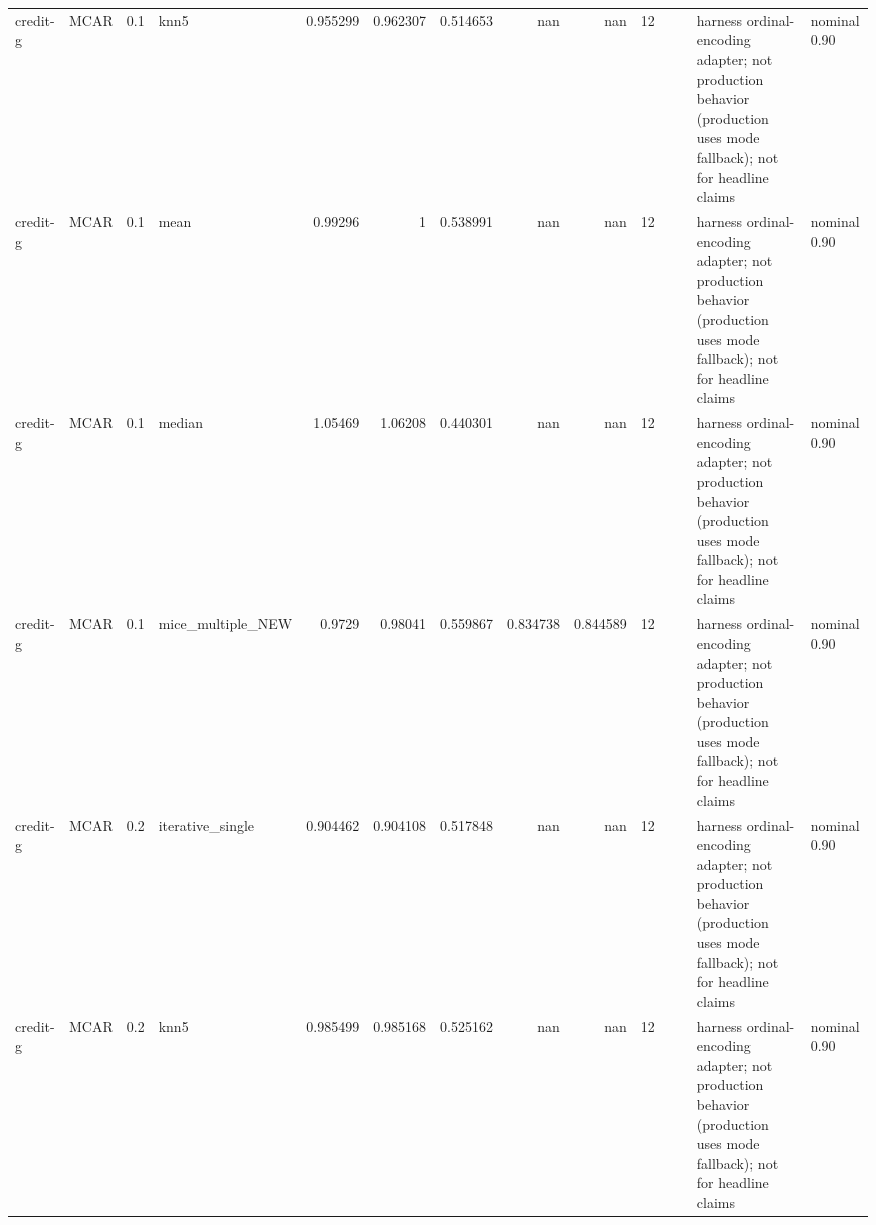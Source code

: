 \begin{table}[ht]
\begin{tabular}{llrlrrrrrrllll}
 credit-g             & MCAR        &         0.1 & knn5              &       0.955299 &             0.962307 &                 0.514653 &                     nan        &                       nan        &        12 &                    &                                         & harness ordinal-encoding adapter; not production behavior (production uses mode fallback); not for headline claims & nominal 0.90              \\
 credit-g             & MCAR        &         0.1 & mean              &       0.99296  &             1        &                 0.538991 &                     nan        &                       nan        &        12 &                    &                                         & harness ordinal-encoding adapter; not production behavior (production uses mode fallback); not for headline claims & nominal 0.90              \\
 credit-g             & MCAR        &         0.1 & median            &       1.05469  &             1.06208  &                 0.440301 &                     nan        &                       nan        &        12 &                    &                                         & harness ordinal-encoding adapter; not production behavior (production uses mode fallback); not for headline claims & nominal 0.90              \\
 credit-g             & MCAR        &         0.1 & mice\_multiple\_NEW &       0.9729   &             0.98041  &                 0.559867 &                       0.834738 &                         0.844589 &        12 &                    &                                         & harness ordinal-encoding adapter; not production behavior (production uses mode fallback); not for headline claims & nominal 0.90              \\
 credit-g             & MCAR        &         0.2 & iterative\_single  &       0.904462 &             0.904108 &                 0.517848 &                     nan        &                       nan        &        12 &                    &                                         & harness ordinal-encoding adapter; not production behavior (production uses mode fallback); not for headline claims & nominal 0.90              \\
 credit-g             & MCAR        &         0.2 & knn5              &       0.985499 &             0.985168 &                 0.525162 &                     nan        &                       nan        &        12 &                    &                                         & harness ordinal-encoding adapter; not production behavior (production uses mode fallback); not for headline claims & nominal 0.90              \\

\end{tabular}
\end{table}
